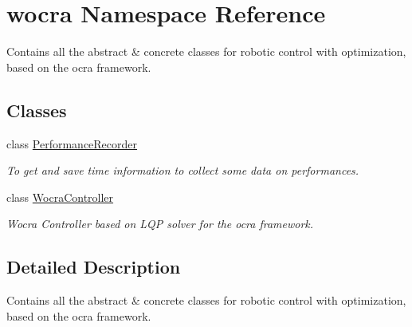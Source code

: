 \hypertarget{namespacewocra}{}\section{wocra Namespace Reference}
\label{namespacewocra}


Contains all the abstract \& concrete classes for robotic control with optimization, based on the ocra framework.  


\subsection*{Classes}
\begin{DoxyCompactItemize}
\item 
class \hyperlink{classwocra_1_1PerformanceRecorder}{Performance\+Recorder}
\begin{DoxyCompactList}\small\item\em To get and save time information to collect some data on performances. \end{DoxyCompactList}\item 
class \hyperlink{classwocra_1_1WocraController}{Wocra\+Controller}
\begin{DoxyCompactList}\small\item\em Wocra Controller based on L\+QP solver for the ocra framework. \end{DoxyCompactList}\end{DoxyCompactItemize}


\subsection{Detailed Description}
Contains all the abstract \& concrete classes for robotic control with optimization, based on the ocra framework. 

